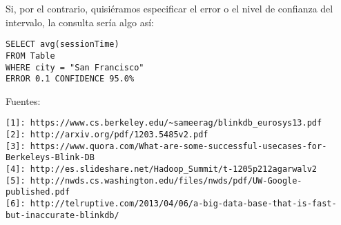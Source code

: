 \documentclass[12pt,a4paper,twoside,openright,titlepage,final]{article}
\begin{document}
Si, por el contrario, quisiéramos especificar el error o el nivel de confianza del intervalo, la consulta sería algo así:

\begin{verbatim}
SELECT avg(sessionTime)
FROM Table
WHERE city = "San Francisco"
ERROR 0.1 CONFIDENCE 95.0%
\end{verbatim}

Fuentes:\\
\begin{verbatim}
[1]: https://www.cs.berkeley.edu/~sameerag/blinkdb_eurosys13.pdf
[2]: http://arxiv.org/pdf/1203.5485v2.pdf
[3]: https://www.quora.com/What-are-some-successful-usecases-for-Berkeleys-Blink-DB
[4]: http://es.slideshare.net/Hadoop_Summit/t-1205p212agarwalv2
[5]: http://nwds.cs.washington.edu/files/nwds/pdf/UW-Google-published.pdf
[6]: http://telruptive.com/2013/04/06/a-big-data-base-that-is-fast-but-inaccurate-blinkdb/
\end{verbatim}
\end{document}
